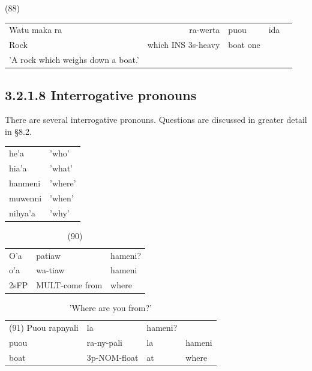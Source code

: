 \documentclass[10pt]{article}
\begin{document}
(88)

\begin{center}
\begin{tabular}{lrlcl}
Watu maka ra & ra-werta & puou & ida \\
Rock & which INS 3s-heavy & boat one &  \\
'A rock which weighs down a boat.' &  &  &  \\
\end{tabular}
\end{center}

\subsection*{3.2.1.8 Interrogative pronouns}
There are several interrogative pronouns. Questions are discussed in greater detail in §8.2.

\begin{center}
\begin{tabular}{ll}
he'a & 'who' \\
hia'a & 'what' \\
hanmeni & 'where' \\
muwenni & 'when' \\
nihya'a & 'why' \\
\end{tabular}
\end{center}

\begin{table}[h]
\begin{center}
\captionsetup{labelformat=empty}
\caption{(90)}
\begin{tabular}{lll}
O'a & patiaw & hameni? \\
o'a & wa-tiaw & hameni \\
2sFP & MULT-come from & where \\
\end{tabular}
\end{center}
\end{table}

\begin{table}[h]
\begin{center}
\captionsetup{labelformat=empty}
\caption{'Where are you from?'}
\begin{tabular}{llll}
(91) Puou rapnyali & la & hameni? &  \\
puou & ra-ny-pali & la & hameni \\
boat & 3p-NOM-float & at & where \\
\end{tabular}
\end{center}
\end{table}
\end{document}
